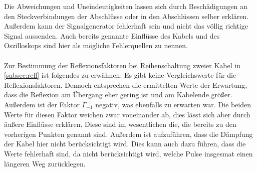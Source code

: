 Die Abweichungen und Uneindeutigkeiten lassen sich durch Beschädigungen an den Steckverbindungen der Abschlüsse oder in den Abschlüssen selber erklären.
Außerdem kann der Signalgenerator fehlerhaft sein und nicht das völlig richtige Signal aussenden. 
Auch bereits genannte Einflüsse des Kabels und des Oszilloskops sind hier als mögliche Fehlerquellen zu nennen.
\\\\
Zur Bestimmung der Reflexionsfaktoren bei Reihenschaltung zweier Kabel in \autoref{subsec:refl} ist folgendes zu erwähnen:
Es gibt keine Vergleichswerte für die Reflexionsfaktoren.
Dennoch entsprechen die ermittelten Werte der Erwartung, dass die Reflexion am Übergang eher gering ist und am Kabelende größer. 
Außerdem ist der Faktor $\Gamma_{-1}$ negativ, was ebenfalls zu erwarten war. 
Die beiden Werte für diesen Faktor weichen zwar voneinander ab, dies lässt sich aber durch äußere Einflüsse erklären.
Diese sind im wesentlichen die, die bereits zu den vorherigen Punkten genannt sind. 
Außerdem ist aufzuführen, dass die Dämpfung der Kabel hier nicht berücksichtigt wird. 
Dies kann auch dazu führen, dass die Werte fehlerhaft sind, da nicht berücksichtigt wird, welche Pulse insgesmat einen längeren Weg zurücklegen.
